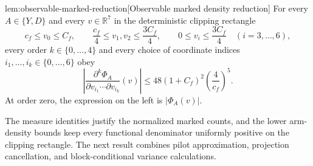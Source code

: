 \begin{lemmav}{lem:observable-marked-reduction}[Observable marked density reduction]
For every \(A\in\{Y,D\}\) and every \(v\in\mathbb R^7\) in the deterministic clipping rectangle
\[
c_f\le v_0\le C_f,\qquad
\frac{c_f}{4}\le v_1,v_2\le\frac{3C_f}{4},\qquad
0\le v_i\le\frac{3C_f}{4}\quad(i=3,\ldots,6),
\]
every order \(k\in\{0,\ldots,4\}\) and every choice of coordinate indices \(i_1,\ldots,i_k\in\{0,\ldots,6\}\) obey
\[
\left|
\frac{\partial^k\Phi_A}{\partial v_{i_1}\cdots\partial v_{i_k}}(v)
\right|
\le
48(1+C_f)^2\left(\frac{4}{c_f}\right)^5.
\]
At order zero, the expression on the left is \(\lvert\Phi_A(v)\rvert\).
\end{lemmav}

The measure identities justify the normalized marked counts, and the lower arm-density bounds keep every functional denominator uniformly positive on the clipping rectangle. The next result combines pilot approximation, projection cancellation, and block-conditional variance calculations.

